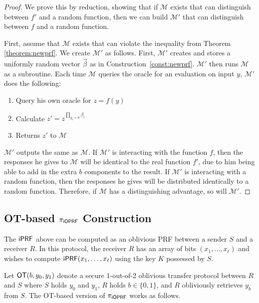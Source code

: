 \begin{proof}
We prove this by reduction, showing that if $\mathcal{M}$ exists that can distinguish between $f'$ and a random function, then we can build $\mathcal{M}'$ that can distinguish between $f$ and a random function.

First, assume that $\mathcal{M}$ exists that can violate the inequality from Theorem \ref{theorem:newprf}.  We create $\mathcal{M'}$ as follows.  First, $\mathcal{M}'$ creates and stores a uniformly random vector $\vec{\beta}$ as in Construction~\ref{const:newprf}.  $\mathcal{M}'$ then runs $\mathcal{M}$ as a subroutine.  Each time $\mathcal{M}$ queries the oracle for an evaluation on input $y$, $\mathcal{M}'$ does the following:

\begin{enumerate}
\item Query his own oracle for $z = f(y)$
\item Calculate $z' = z^{\prod_{y_i = 0} \beta_i}$
\item Returns $z'$ to $\mathcal{M}$
\end{enumerate}

$\mathcal{M}'$ outputs the same as $\mathcal{M}$.  If  $\mathcal{M}'$ is interacting with the function $f$, then the responses he gives to $\mathcal{M}$ will be identical to the real function $f'$, due to him being able to add in the extra $b$ components to the result.  If $\mathcal{M}'$ is interacting with a random function, then the responses he gives will be distributed identically to a random function.  Therefore, if $\mathcal{M}$ has a distinguishing advantage, so will $\mathcal{M}'$.
\end{proof}





\subsection{OT-based ${\pi_{\mathsf{i}\mathsf{OPRF}}}$ Construction}

The $\mathsf{i}\mathsf{PRF}$ above can be computed as an oblivious PRF between a sender $S$ and a receiver $R$.  In this protocol,
the receiver $R$ has an array of bits $(x_1, \ldots, x_\ell)$ and wishes to compute $\mathsf{i}\mathsf{PRF}(x_1, \ldots, x_\ell)$ using
the key $K$ possessed by $S$.

Let $\mathsf{OT}(b, y_0, y_1)$ denote a secure 1-out-of-2 oblivious transfer protocol between $R$ and $S$ where
$S$ holds $y_0$ and $y_1$, $R$ holds $b\in\{0,1\}$, and $R$ obliviously retrieves $y_b$ from $S$.  The OT-based version of ${\pi_{\mathsf{i}\mathsf{OPRF}}}$ works as follows.

